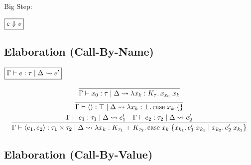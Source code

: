Big Step:

$\fbox{$e \Downarrow v$}$

\subsection{Elaboration (Call-By-Name)}

$\fbox{$\Gamma \vdash e: \tau \mid \Delta \rightsquigarrow e'$}$

\begin{gather*}
  \infer{\Gamma \vdash x_0: \tau \mid \Delta \elaborate \lambda x_k: K_\tau\ldotp x_{x_0}\; x_k}{}
  \\
  \infer{\Gamma \vdash \langle\rangle: \top \mid \Delta \elaborate \lambda x_k: \bot\ldotp \symcase x_k\; \{\}}{}
  \\
  \infer{\Gamma \vdash \langle e_1, e_2\rangle: \tau_1 \times \tau_2 \mid \Delta \elaborate \lambda x_k: K_{\tau_1} \plus K_{\tau_2}\ldotp \symcase x_k\; \{x_{k_1}\ldotp e_1'\; x_{k_1} \mid x_{k_2}\ldotp e_2'\; x_{k_2}\}}{
    \Gamma \vdash e_1: \tau_1 \mid \Delta \elaborate e_1'
    &
    \Gamma \vdash e_2: \tau_2 \mid \Delta \elaborate e_2'
  }
\end{gather*}

\subsection{Elaboration (Call-By-Value)}

